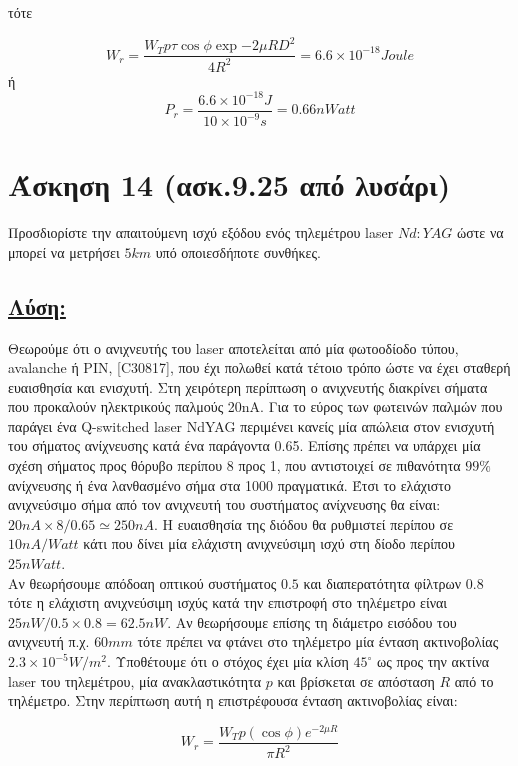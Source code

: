 \documentclass[a4paper,11pt,titlepage]{article}
\newcommand{\degrees}{^{\circ}}
\numberwithin{equation}{section} %
\begin{document}
τότε

\begin{equation}
 W_r=\dfrac{W_T p \tau\cos{\phi}\exp{-2\mu R}D^2}{4R^2}=6.6\times10^{-18}Joule
\end{equation}
ή
\begin{equation}
 P_r=\dfrac{6.6\times10^{-18}J}{10\times10^{-9}s}=0.66nWatt
\end{equation}

\section{Άσκηση 14 (ασκ.9.25 από λυσάρι)}

Προσδιορίστε την απαιτούμενη ισχύ εξόδου ενός τηλεμέτρου laser $Nd:YAG$ ώστε να μπορεί να μετρήσει $5km$ υπό οποιεσδήποτε συνθήκες.

\subsection*{\underline{Λύση:}}

Θεωρούμε ότι ο ανιχνευτής του laser αποτελείται από μία φωτοοδίοδο τύπου, avalanche ή PIN, [C30817], που έχι πολωθεί κατά τέτοιο τρόπο ώστε να έχει σταθερή ευαισθησία και ενισχυτή. Στη χειρότερη περίπτωση ο ανιχνευτής διακρίνει σήματα που προκαλούν ηλεκτρικούς παλμούς 20nA. Για το εύρος των φωτεινών παλμών που παράγει ένα Q-switched laser NdYAG περιμένει κανείς μία απώλεια στον ενισχυτή του σήματος ανίχνευσης κατά ένα παράγοντα 0.65. Επίσης πρέπει να υπάρχει μία σχέση σήματος προς θόρυβο περίπου 8 προς 1, που αντιστοιχεί σε πιθανότητα $99\%$ ανίχνευσης ή ένα λανθασμένο σήμα στα 1000 πραγματικά. Έτσι το ελάχιστο ανιχνεύσιμο σήμα από τον ανιχνευτή του συστήματος ανίχνευσης θα είναι: $20nA\times8/0.65\simeq250nA$. Η ευαισθησία της διόδου θα ρυθμιστεί περίπου σε $10nA/Watt$ κάτι που δίνει μία ελάχιστη ανιχνεύσιμη ισχύ στη δίοδο περίπου $25nWatt$.\\
Αν θεωρήσουμε απόδοαη οπτικού συστήματος $0.5$ και διαπερατότητα φίλτρων $0.8$ τότε η ελάχιστη ανιχνεύσιμη ισχύς κατά την επιστροφή στο τηλέμετρο είναι $25nW/0.5\times0.8=62.5nW$. Αν θεωρήσουμε επίσης τη διάμετρο εισόδου του ανιχνευτή π.χ. $60mm$ τότε πρέπει να φτάνει στο τηλέμετρο μία ένταση ακτινοβολίας $2.3\times10^{-5}W/m^2$. Υποθέτουμε ότι ο στόχος έχει μία κλίση $45\degrees$ ως προς την ακτίνα laser του τηλεμέτρου, μία ανακλαστικότητα $p$ και βρίσκεται σε απόσταση $R$ από το τηλέμετρο. Στην περίπτωση αυτή η επιστρέφουσα ένταση ακτινοβολίας είναι:

\begin{equation}
  W_r=\dfrac{W_T p (\cos\phi)e^{-2\mu R}}{\pi R^2}
\end{equation}
\end{document}
